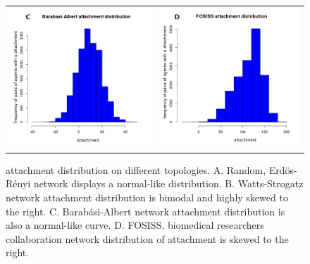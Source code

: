 \documentclass[11pt]{article}
\begin{document}
\begin{figure} [h!]
\begin{tabular}{cc}
\includegraphics[scale=0.28]{images/barabasi_trust.png} & 
\includegraphics[scale=0.28]{images/fosiss_trust.png}
\end{tabular}
\caption{attachment distribution on different topologies. A. Random, Erd\"{o}s-R\'enyi network displays a normal-like
  distribution. B. Watts-Strogatz network attachment distribution is bimodal and highly skewed to the right. C.
  Barab\'asi-Albert network attachment distribution is also a normal-like curve. D. FOSISS, biomedical researchers
  collaboration network distribution of attachment is skewed to
  the right.}\label{histo_trust}  
\end{figure}
\end{document}
